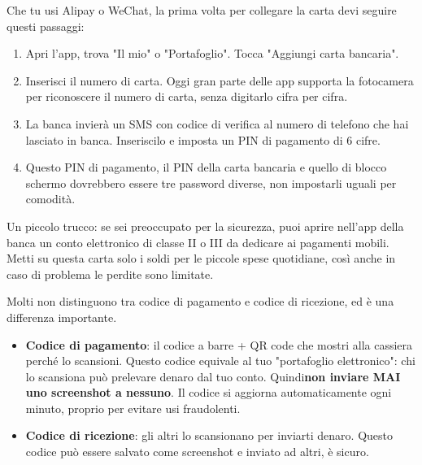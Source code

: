 


Che tu usi Alipay o WeChat, la prima volta per collegare la carta devi seguire questi passaggi:

\begin{enumerate}
  \item Apri l'app, trova "Il mio" o "Portafoglio". Tocca "Aggiungi carta bancaria".
  \item Inserisci il numero di carta. Oggi gran parte delle app supporta la fotocamera per riconoscere il numero di carta, senza digitarlo cifra per cifra.
  \item La banca invierà un SMS con codice di verifica al numero di telefono che hai lasciato in banca. Inseriscilo e imposta un PIN di pagamento di 6 cifre.
  \item Questo PIN di pagamento, il PIN della carta bancaria e quello di blocco schermo dovrebbero essere tre password diverse, non impostarli uguali per comodità.
\end{enumerate}

Un piccolo trucco: se sei preoccupato per la sicurezza, puoi aprire nell'app della banca un conto elettronico di classe II o III da dedicare ai pagamenti mobili. Metti su questa carta solo i soldi per le piccole spese quotidiane, così anche in caso di problema le perdite sono limitate.


Molti non distinguono tra codice di pagamento e codice di ricezione, ed è una differenza importante.

\begin{itemize}
  \item \textbf{Codice di pagamento}: il codice a barre + QR code che mostri alla cassiera perché lo scansioni. Questo codice equivale al tuo "portafoglio elettronico": chi lo scansiona può prelevare denaro dal tuo conto. Quindi\textbf{non inviare MAI uno screenshot a nessuno}. Il codice si aggiorna automaticamente ogni minuto, proprio per evitare usi fraudolenti.
  \item \textbf{Codice di ricezione}: gli altri lo scansionano per inviarti denaro. Questo codice può essere salvato come screenshot e inviato ad altri, è sicuro.
\end{itemize}


